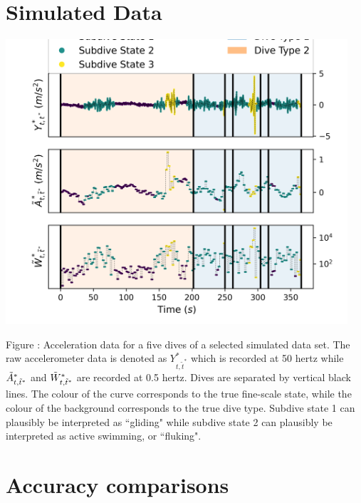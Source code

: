 \documentclass{article}
\begin{document}
\iffalse
\newpage

    \section{Simulated Data}
    
        \begin{center}
    	\includegraphics[width=5in]{../Plots/sim_data.png}
    	\end{center}
    	
    	\noindent Figure : Acceleration data for a five dives of a selected simulated data set. The raw accelerometer data is denoted as $Y^*_{t,\tilde t^*}$ which is recorded at 50 hertz while $\tilde{A}^*_{t,\tilde t^*}$ and $\tilde{W}^*_{t,\tilde t^*}$ are recorded at 0.5 hertz. Dives are separated by vertical black lines. The colour of the curve corresponds to the true fine-scale state, while the colour of the background corresponds to the true dive type. Subdive state 1 can plausibly be interpreted as ``gliding" while subdive state 2 can plausibly be interpreted as active swimming, or ``fluking".
    	\addtocounter{fignum}{1}

    \newpage
    \section{Accuracy comparisons}
        
\end{document}
